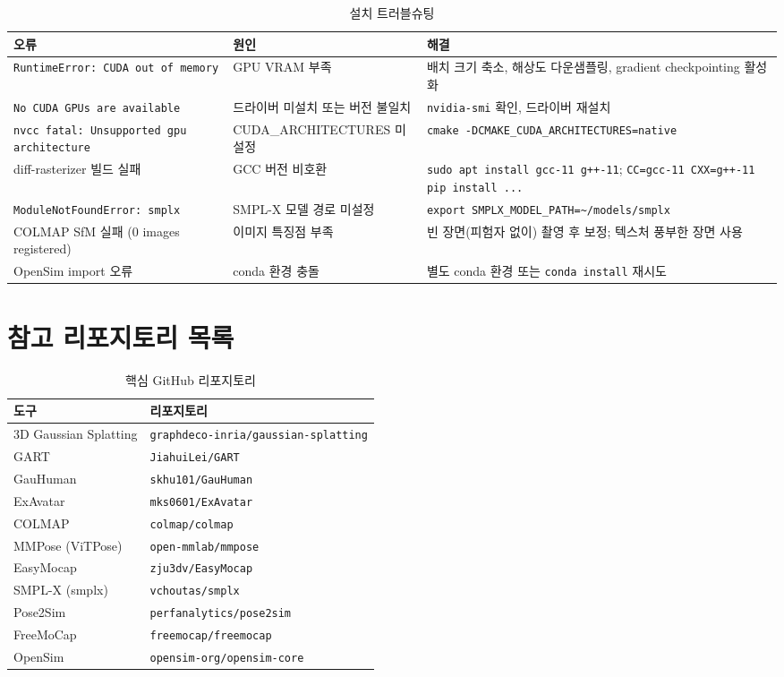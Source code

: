 \documentclass[11pt, a4paper]{report}
\begin{document}
\begin{table}[H]
\centering
\caption{설치 트러블슈팅}
\label{tab:troubleshoot}
\renewcommand{\arraystretch}{1.4}
\small
\begin{tabularx}{\textwidth}{p{4cm}XX}
\toprule
\textbf{오류} & \textbf{원인} & \textbf{해결} \\
\midrule
\texttt{RuntimeError: CUDA out of memory} &
  GPU VRAM 부족 &
  배치 크기 축소, 해상도 다운샘플링, gradient checkpointing 활성화 \\
\addlinespace
\texttt{No CUDA GPUs are available} &
  드라이버 미설치 또는 버전 불일치 &
  \texttt{nvidia-smi} 확인, 드라이버 재설치 \\
\addlinespace
\texttt{nvcc fatal: Unsupported gpu architecture} &
  CUDA\_ARCHITECTURES 미설정 &
  \texttt{cmake -DCMAKE\_CUDA\_ARCHITECTURES=native} \\
\addlinespace
diff-rasterizer 빌드 실패 &
  GCC 버전 비호환 &
  \texttt{sudo apt install gcc-11 g++-11}; \texttt{CC=gcc-11 CXX=g++-11 pip install ...} \\
\addlinespace
\texttt{ModuleNotFoundError: smplx} &
  SMPL-X 모델 경로 미설정 &
  \texttt{export SMPLX\_MODEL\_PATH=\textasciitilde/models/smplx} \\
\addlinespace
COLMAP SfM 실패 (0 images registered) &
  이미지 특징점 부족 &
  빈 장면(피험자 없이) 촬영 후 보정; 텍스처 풍부한 장면 사용 \\
\addlinespace
OpenSim import 오류 &
  conda 환경 충돌 &
  별도 conda 환경 또는 \texttt{conda install} 재시도 \\
\bottomrule
\end{tabularx}
\end{table}


\chapter{참고 리포지토리 목록}

\begin{table}[H]
\centering
\caption{핵심 GitHub 리포지토리}
\label{tab:repos}
\renewcommand{\arraystretch}{1.3}
\small
\begin{tabularx}{\textwidth}{lX}
\toprule
\textbf{도구} & \textbf{리포지토리} \\
\midrule
3D Gaussian Splatting & \texttt{graphdeco-inria/gaussian-splatting} \\
GART & \texttt{JiahuiLei/GART} \\
GauHuman & \texttt{skhu101/GauHuman} \\
ExAvatar & \texttt{mks0601/ExAvatar} \\
COLMAP & \texttt{colmap/colmap} \\
MMPose (ViTPose) & \texttt{open-mmlab/mmpose} \\
EasyMocap & \texttt{zju3dv/EasyMocap} \\
SMPL-X (smplx) & \texttt{vchoutas/smplx} \\
Pose2Sim & \texttt{perfanalytics/pose2sim} \\
FreeMoCap & \texttt{freemocap/freemocap} \\
OpenSim & \texttt{opensim-org/opensim-core} \\
\bottomrule
\end{tabularx}
\end{table}
\end{document}
